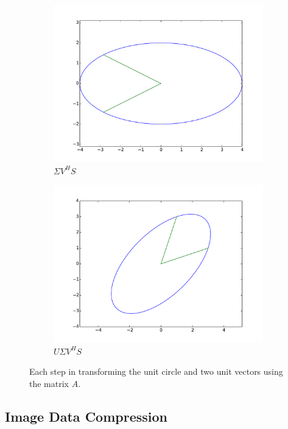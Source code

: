 \begin{figure}
\begin{subfigure}[b]{.49\textwidth}
  \includegraphics[width=\textwidth]{svcircle.pdf}
  \caption{$\Sigma V^H S$}
\end{subfigure}
\begin{subfigure}[b]{.49\textwidth}
  \centering
  \includegraphics[width=\textwidth]{full_transformation.pdf}
  \caption{$U \Sigma V^H S$}
\end{subfigure}
\caption{Each step in transforming the unit circle and two unit vectors using the matrix $A$.}
\label{fig:sol1}
\end{figure}


\subsection*{Image Data Compression}

